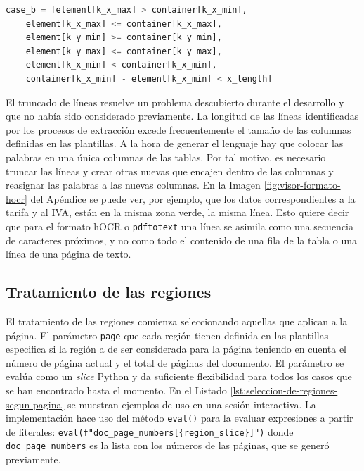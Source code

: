 \begin{lstlisting}[language=Python,caption={Evaluación de las condiciones del Caso B.},label=lst:condiciones-caso-b]
    case_b = [element[k_x_max] > container[k_x_min],
    element[k_x_max] <= container[k_x_max],
    element[k_y_min] >= container[k_y_min],
    element[k_y_max] <= container[k_y_max],
    element[k_x_min] < container[k_x_min],
    container[k_x_min] - element[k_x_min] < x_length]
\end{lstlisting}

El truncado de líneas resuelve un problema descubierto durante el desarrollo y que no había sido considerado previamente. La longitud de las líneas identificadas por los procesos de extracción excede frecuentemente el tamaño de las columnas definidas en las plantillas. A la hora de generar el lenguaje hay que colocar las palabras en una única columnas de las tablas. Por tal motivo, es necesario truncar las líneas y crear otras nuevas que encajen dentro de las columnas y reasignar las palabras a las nuevas columnas. En la Imagen \ref{fig:visor-formato-hocr} del Apéndice se puede ver, por ejemplo, que los datos correspondientes a la tarifa y al IVA, están en la misma zona verde, la misma línea. Esto quiere decir que para el formato hOCR o \verb|pdftotext| una línea se asimila como una secuencia de caracteres próximos, y no como todo el contenido de una fila de la tabla o una línea de una página de texto.


\subsection{Tratamiento de las regiones}

El tratamiento de las regiones comienza seleccionando aquellas que aplican a la página. El parámetro \verb|page| que cada región tienen definida en las plantillas especifica si la región a de ser considerada para la página teniendo en cuenta el número de página actual y el total de páginas del documento. El parámetro se evalúa como un \emph{slice} Python y da suficiente flexibilidad para todos los casos que se han encontrado hasta el momento. En el Listado \ref{lst:seleccion-de-regiones-segun-pagina} se muestran ejemplos de uso en una sesión interactiva. La implementación hace uso del método \verb|eval()| para la evaluar expresiones a partir de literales: \verb|eval(f"doc_page_numbers[{region_slice}]")| donde \verb|doc_page_numbers| es la lista con los números de las páginas, que se generó previamente.


